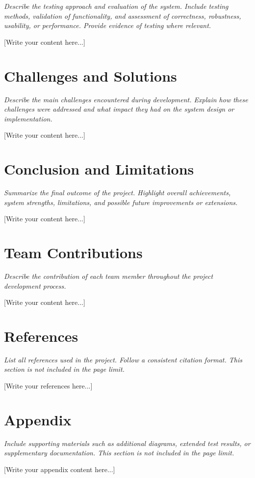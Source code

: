 \documentclass[12pt,oneside,openany,dvipsnames]{article}
\begin{document}
\textit{Describe the testing approach and evaluation of the system. Include testing methods, validation of functionality, and assessment of correctness, robustness, usability, or performance. Provide evidence of testing where relevant.}

[Write your content here...]

\section{Challenges and Solutions}

\textit{Describe the main challenges encountered during development. Explain how these challenges were addressed and what impact they had on the system design or implementation.}

[Write your content here...]

\section{Conclusion and Limitations}

\textit{Summarize the final outcome of the project. Highlight overall achievements, system strengths, limitations, and possible future improvements or extensions.}

[Write your content here...]

\section{Team Contributions}

\textit{Describe the contribution of each team member throughout the project development process.}

[Write your content here...]

\section{References}

\textit{List all references used in the project. Follow a consistent citation format. This section is not included in the page limit.}

[Write your references here...]

\newpage
\appendix

\section{Appendix}

\textit{Include supporting materials such as additional diagrams, extended test results, or supplementary documentation. This section is not included in the page limit.}

[Write your appendix content here...]
\end{document}
